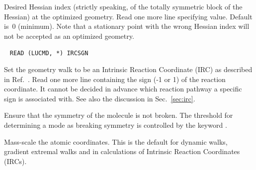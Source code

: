 \begin{description}
Desired Hessian index (strictly speaking, of the
totally symmetric block of the Hessian) at the optimized geometry.
Read one more line specifying value.  Default is~0 (minimum).
Note that a stationary point with the wrong Hessian index will not
be accepted as an optimized geometry.

\item[\Key{IRC}]\verb| |\newline
\verb|READ (LUCMD, *) IRCSGN|

Set the geometry walk to be  an
Intrinsic Reaction Coordinate (IRC) as described in
Ref.~\cite{kfacr14}. Read one
more line containing the sign (-1 or 1) of the reaction coordinate. It
cannot be decided in advance which reaction pathway a specific sign is
associated with. See also the discussion in Sec.~\ref{sec:irc}.

%

\item[\Key{KEEPSY}] Ensure that the symmetry of the molecule is not
broken. The threshold for determining a mode as breaking symmetry is
controlled by the keyword .

\item[\Key{MASSES}] Mass-scale the atomic
coordinates.  This is the
default for dynamic walks, gradient
extremal walks and in calculations
of Intrinsic Reaction Coordinates
(IRCs).


\end{description}
